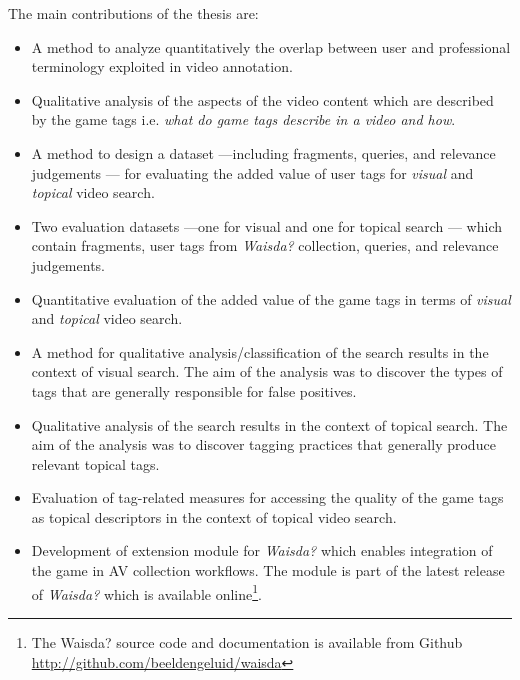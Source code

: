 The main contributions of the thesis are:
\begin{itemize}
\item A method to analyze quantitatively the overlap between user and professional terminology exploited in video annotation.
\item Qualitative analysis of the aspects of the video content which are described by the game tags i.e. \textit{what do game tags describe in a video and how}.
\item A method to design a dataset ---including fragments, queries, and relevance judgements --- for evaluating the added value of user tags for \textit{visual} and \textit{topical} video search.
\item Two evaluation datasets ---one for visual and one for topical search --- which contain fragments, user tags from \textit{Waisda?} collection, queries, and relevance judgements.
\item Quantitative evaluation of the added value of the game tags in terms of \textit{visual} and \textit{topical} video search.

\item A method for qualitative analysis/classification of the search results in the context of visual search. The aim of the analysis was to discover the types of tags that are generally responsible for false positives.

\item Qualitative analysis of the search results in the context of topical search. The aim of the analysis was to discover tagging practices that generally produce relevant topical tags.

\item Evaluation of tag-related measures for accessing the quality of the game tags as topical descriptors in the context of topical video search.

\item Development of extension module for \textit{Waisda?} which enables integration of the game in AV collection workflows. The module is part of the latest release of \textit{Waisda?} which is available online\footnote{The Waisda? source code and documentation is available from Github \url{http://github.com/beeldengeluid/waisda}}.
\end{itemize}

